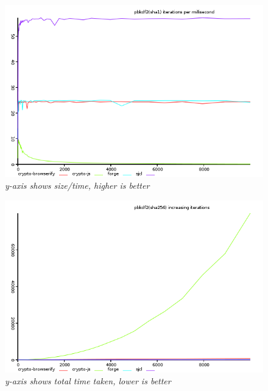 \begin{figure}[htpb]
\centering
\caption{\small \sl y-axis shows size/time, higher is better
\label{fig:pbkdf2-ops-sha1}}
\includegraphics[scale=0.6]{graphs/pbkdf2-ops-sha1.png}
\end{figure}

\begin{figure}[htpb]
\centering
\caption{\small \sl y-axis shows total time taken, lower is better
\label{fig:pbkdf2-sha256}}
\includegraphics[scale=0.6]{graphs/pbkdf2-sha256.png}
\end{figure}

